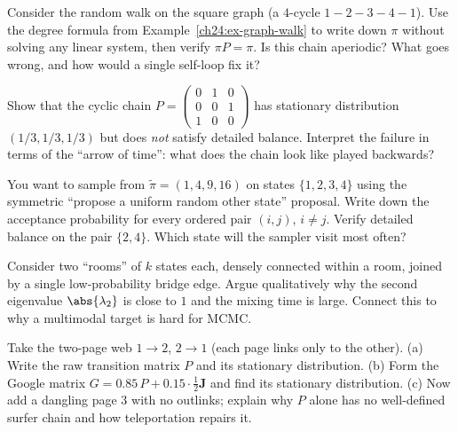 \begin{exercise}
Consider the random walk on the square graph (a $4$-cycle $1\!-\!2\!-\!3\!-\!4\!-\!1$).
Use the degree formula from Example~\ref{ch24:ex-graph-walk} to write down $\pi$
without solving any linear system, then verify $\pi P = \pi$. Is this chain
aperiodic? What goes wrong, and how would a single self-loop fix it?
\end{exercise}

\begin{exercise}
Show that the cyclic chain
$P=\left(\begin{smallmatrix}0&1&0\\0&0&1\\1&0&0\end{smallmatrix}\right)$ has
stationary distribution $(1/3,1/3,1/3)$ but does \emph{not} satisfy detailed
balance. Interpret the failure in terms of the ``arrow of time'': what does the
chain look like played backwards?
\end{exercise}

\begin{exercise}
You want to sample from $\tilde\pi = (1, 4, 9, 16)$ on states $\{1,2,3,4\}$ using
the symmetric ``propose a uniform random other state'' proposal. Write down the
acceptance probability for every ordered pair $(i,j)$, $i\neq j$. Verify detailed
balance on the pair $\{2,4\}$. Which state will the sampler visit most often?
\end{exercise}

\begin{exercise}
Consider two ``rooms'' of $k$ states each, densely connected within a room, joined
by a single low-probability bridge edge. Argue qualitatively why the second
eigenvalue $\abs{\lambda_2}$ is close to $1$ and the mixing time is large.
Connect this to why a multimodal target is hard for MCMC.
\end{exercise}

\begin{exercise}
Take the two-page web $1 \to 2$, $2 \to 1$ (each page links only to the other).
(a) Write the raw transition matrix $P$ and its stationary distribution.
(b) Form the Google matrix $G = 0.85\,P + 0.15\cdot\tfrac12 \mathbf{J}$ and find
its stationary distribution. (c) Now add a dangling page $3$ with no outlinks;
explain why $P$ alone has no well-defined surfer chain and how teleportation
repairs it.
\end{exercise}

